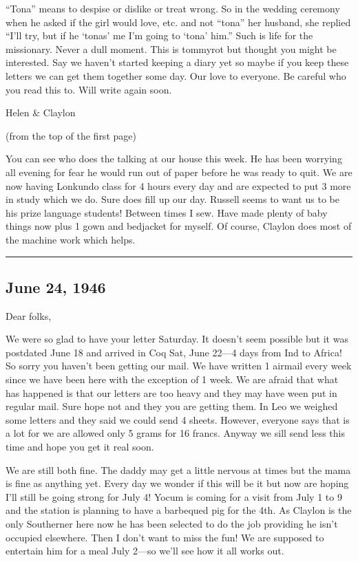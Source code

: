 \documentclass[
]{book}
\begin{document}
``Tona'' means to despise or dislike or treat wrong. So in the wedding ceremony when he asked if the girl would love, etc. and not ``tona'' her husband, she replied ``I'll try, but if he `tonas' me I'm going to `tona' him.'' Such is life for the missionary. Never a dull moment. This is tommyrot but thought you might be interested. Say we haven't started keeping a diary yet so maybe if you keep these letters we can get them together some day. Our love to everyone. Be careful who you read this to. Will write again soon.

Helen \& Claylon

(from the top of the first page)

You can see who does the talking at our house this week. He has been worrying all evening for fear he would run out of paper before he was ready to quit. We are now having Lonkundo class for 4 hours every day and are expected to put 3 more in study which we do. Sure does fill up our day. Russell seems to want us to be his prize language students! Between times I sew. Have made plenty of baby things now plus 1 gown and bedjacket for myself. Of course, Claylon does most of the machine work which helps.

\begin{center}\rule{0.5\linewidth}{0.5pt}\end{center}

\hypertarget{june-24-1946}{%
\subsection{June 24, 1946}\label{june-24-1946}}

Dear folks,

We were so glad to have your letter Saturday. It doesn't seem possible but it was postdated June 18 and arrived in Coq Sat, June 22---4 days from Ind to Africa! So sorry you haven't been getting our mail. We have written 1 airmail every week since we have been here with the exception of 1 week. We are afraid that what has happened is that our letters are too heavy and they may have ween put in regular mail. Sure hope not and they you are getting them. In Leo we weighed some letters and they said we could send 4 sheets. However, everyone says that is a lot for we are allowed only 5 grams for 16 francs. Anyway we sill send less this time and hope you get it real soon.

We are still both fine. The daddy may get a little nervous at times but the mama is fine as anything yet. Every day we wonder if this will be it but now are hoping I'll still be going strong for July 4! Yocum is coming for a visit from July 1 to 9 and the station is planning to have a barbequed pig for the 4th. As Claylon is the only Southerner here now he has been selected to do the job providing he isn't occupied elsewhere. Then I don't want to miss the fun! We are supposed to entertain him for a meal July 2---so we'll see how it all works out.
\end{document}

